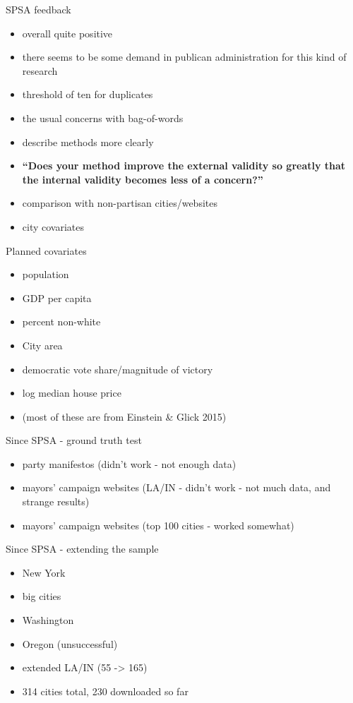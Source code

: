 \documentclass[12pt]{beamer}
\begin{document}
\begin{frame}{SPSA feedback}
\begin{itemize}
	\item overall quite positive
	\item there seems to be some demand in publican administration for this kind of research
	\item threshold of ten for duplicates
	\item the usual concerns with bag-of-words
	\item describe methods more clearly
	\item \textbf{``Does your method improve the external validity so greatly that the internal validity becomes less of a concern?''}
	\item comparison with non-partisan cities/websites
	\item city covariates
\end{itemize}
\end{frame}

\begin{frame}{Planned covariates}
\begin{itemize}
	\item population
	\item GDP per capita
	\item percent non-white
	\item City area
	\item democratic vote share/magnitude of victory
	\item log median house price
	\item (most of these are from Einstein \& Glick 2015)
\end{itemize}
\end{frame}

\begin{frame}{Since SPSA - ground truth test}
\begin{itemize}
	\item party manifestos (didn't work - not enough data)
	\item mayors' campaign websites (LA/IN - didn't work - not much data, and strange results)
	\item mayors' campaign websites (top 100 cities - worked somewhat)
\end{itemize}
{\renewcommand\normalsize{\tiny}%
	\small
	}
\end{frame}

\begin{frame}{Since SPSA - extending the sample}
\begin{itemize}
	\item New York
	\item big cities
	\item Washington
	\item Oregon (unsuccessful)
	\item extended LA/IN (55 -> 165)
	\item 314 cities total, 230 downloaded so far
\end{itemize}
\end{frame}
\end{document}

